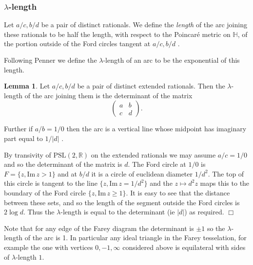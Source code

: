 \documentclass[12pt]{amsart}
\theoremstyle{plain}
\theoremstyle{definition}
\newtheorem{lem}[thm]{Lemma}
\def\HH{\mathbb{H}}
\def\im{\mathrm{Im}\,}
\def\ZZ{\mathbb{Z}}
\def\RR{\mathbb{R}}
\def\sl2{\mathrm{PSL}(2, \ZZ)}
\def\slr{\mathrm{PSL}(2, \RR)}
\begin{document}




\subsubsection{$\lambda$-length}

Let $a/c, b/d$ be a pair of distinct rationals.
We define the \textit{length} of the arc 
joining these rationals 
to be half the length, with respect to the Poincaré metric on $\HH$, 
of the portion  outside of the Ford circles tangent at $a/c, b/d$ .


Following Penner \cite{bob} we define the
$\lambda$-length of an arc to be the exponential of this 
length.

\begin{lem}\label{calcul}
Let $a/c, b/d$ be a pair of distinct extended rationals.
Then the  $\lambda$-length of the arc joining them
 is the determinant of the matrix
$$\begin{pmatrix}
a & b \\ c & d
\end{pmatrix}.$$

Further if $a/b = 1/0$ then the arc is a vertical line 
 whose midpoint has imaginary part equal to $1/|d|$ .
\end{lem}


\proof 
By transivity of $\slr$ on the extended rationals we may assume 
$a/c = 1/0$ and so the determinant of the matrix is $d$.
The Ford circle at $1/0$  is $F= \{ z, \im z > 1\}$ and
at $b/d$ it is a circle of euclidean diameter $1/d^2$.
The top of this circle is tangent to the line $\{ z, \im z = 1/d^2\}$
and the $z \mapsto d^2 z $ maps this to the boundary 
of the Ford circle $\{ z, \im z \geq 1\}$.
It is easy to see that the distance between these sets,
and so the length of the segment outside the Ford circles
is $2\log d$. Thus the $\lambda$-length is equal to the 
determinant (ie $|d|$) as required.
\hfill $\Box$

Note that for any edge of the Farey diagram the determinant is $\pm
1$ so the $\lambda$-length of the arc is 1. In particular any ideal
triangle in the Farey tesselation, for example the one with vertices
$0,-1,\infty$ considered above is equilateral with sides of
$\lambda$-length $1$.
\end{document}
